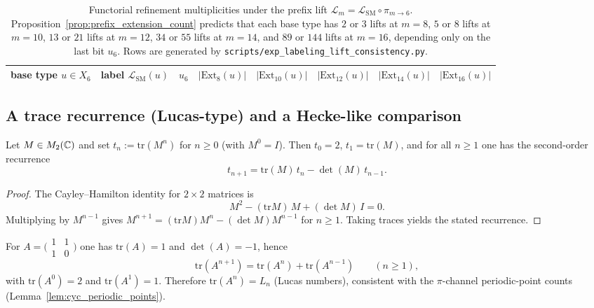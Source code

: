 \begin{table}[H]
\centering
\small
\setlength{\tabcolsep}{6pt}
\renewcommand{\arraystretch}{1.15}
\begin{tabular}{llrrrrrr}
\toprule
base type $u\in X_6$ & label $\mathcal{L}_{\mathrm{SM}}(u)$ & $u_6$ & $|\mathrm{Ext}_8(u)|$ & $|\mathrm{Ext}_{10}(u)|$ & $|\mathrm{Ext}_{12}(u)|$ & $|\mathrm{Ext}_{14}(u)|$ & $|\mathrm{Ext}_{16}(u)|$ \\
\midrule
%
\end{tabular}
\caption{Functorial refinement multiplicities under the prefix lift $\mathcal{L}_m=\mathcal{L}_{\mathrm{SM}}\circ\pi_{m\to 6}$. Proposition~\ref{prop:prefix_extension_count} predicts that each base type has $2$ or $3$ lifts at $m=8$, $5$ or $8$ lifts at $m=10$, $13$ or $21$ lifts at $m=12$, $34$ or $55$ lifts at $m=14$, and $89$ or $144$ lifts at $m=16$, depending only on the last bit $u_6$. Rows are generated by \texttt{scripts/exp\_labeling\_lift\_consistency.py}.}
\label{tab:label_lift_counts}
\end{table}

\subsection{A trace recurrence (Lucas-type) and a Hecke-like comparison}
\label{subsec:trace_recurrence_hecke_comparison}

\begin{lemma}\label{lem:trace_recurrence_2x2}
\MathTag Let $M\in M_2(\mathbb{C})$ and set $t_n:=\mathrm{tr}(M^n)$ for $n\ge 0$ (with $M^0=I$).
Then $t_0=2$, $t_1=\mathrm{tr}(M)$, and for all $n\ge 1$ one has the second-order recurrence
\[
t_{n+1}=\mathrm{tr}(M)\,t_n-\det(M)\,t_{n-1}.
\]
\end{lemma}
\begin{proof}
The Cayley--Hamilton identity for $2\times 2$ matrices is
\[
M^2-(\mathrm{tr}M)\,M+(\det M)\,I=0.
\]
Multiplying by $M^{n-1}$ gives $M^{n+1}=(\mathrm{tr}M)M^n-(\det M)M^{n-1}$ for $n\ge 1$.
Taking traces yields the stated recurrence.
\end{proof}

\begin{corollary}\label{cor:lucas_trace_golden_matrix}
\MathTag For $A=\bigl(\begin{smallmatrix}1&1\\1&0\end{smallmatrix}\bigr)$ one has $\mathrm{tr}(A)=1$ and $\det(A)=-1$, hence
\[
\mathrm{tr}(A^{n+1})=\mathrm{tr}(A^n)+\mathrm{tr}(A^{n-1})\qquad(n\ge 1),
\]
with $\mathrm{tr}(A^0)=2$ and $\mathrm{tr}(A^1)=1$.
Therefore $\mathrm{tr}(A^n)=L_n$ (Lucas numbers), consistent with the $\pi$-channel periodic-point counts (Lemma~\ref{lem:cyc_periodic_points}).
\end{corollary}

